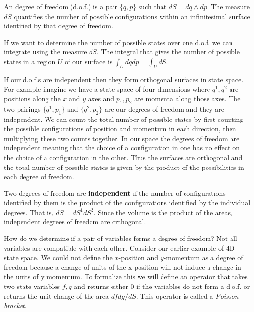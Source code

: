 \documentclass{article}
\begin{document}
\begin{defn}
	An degree of freedom (d.o.f.) is a pair $\{q,p \}$ such that $dS = dq \land dp$. The measure $dS$ quantifies the number of possible configurations within an infinitesimal surface identified by that degree of freedom.
\end{defn}

	If we want to determine the number of possible states over one d.o.f. we can integrate using the measure $dS$. The integral that gives the number of possible states in a region $U$ of our surface is $\int_{U} dq dp = \int_{U} dS$.

	If our d.o.f.s are independent then they form orthogonal surfaces in state space. For example imagine we have a state space of four dimensions where $q^1,q^2$ are positions along the $x$ and $y$ axes and $p_1,p_2$ are momenta along those axes. The two pairings $\{q^1,p_1 \}$ and $\{q^2,p_2 \}$ are our degrees of freedom and they are independent. We can count the total number of possible states by first counting the possible configurations of position and momentum in each direction, then multiplying these two counts together. In our space the degrees of freedom are independent meaning that the choice of a configuration in one has no effect on the choice of a configuration in the other. Thus the surfaces are orthogonal and the total number of possible states is given by the product of the possibilities in each degree of freedom.



\begin{defn}
	Two degrees of freedom are \textbf{independent} if the number of configurations identified by them is the product of the configurations identified by the individual degrees. That is, $dS = dS^1 dS^2$. Since the volume is the product of the areas, independent degrees of freedom are orthogonal.
\end{defn}

	How do we determine if a pair of variables forms a degree of freedom? Not all variables are compatible with each other. Consider our earlier example of 4D state space. We could not define the $x$-position and $y$-momentum as a degree of freedom because a change of units of the x position will not induce a change in the units of y momentum. To formalize this we will define an operator that takes two state variables $f,g$ and returns either 0 if the variables do not form a d.o.f. or returns the unit change of the area $dfdg/dS$. This operator is called a \textit{Poisson bracket}.
\end{document}
